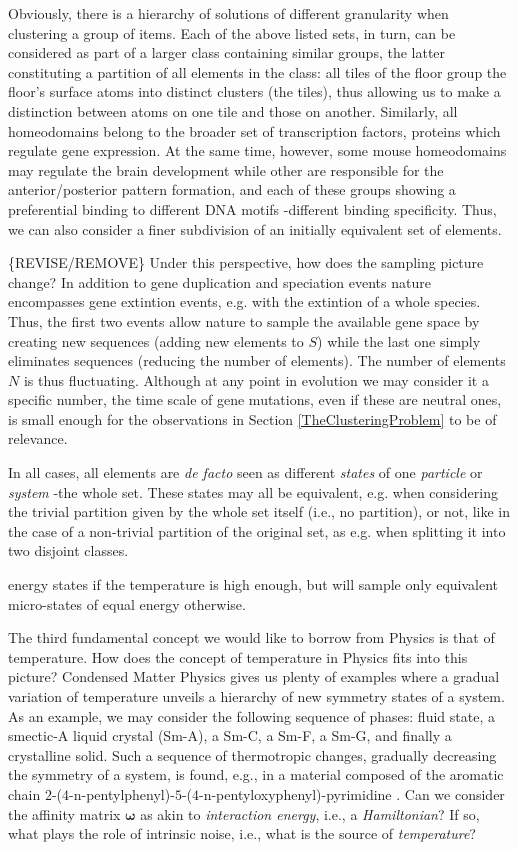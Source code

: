 \documentclass[twocolumn,aps,sort,nofootinbib]{revtex4}
\begin{document}
Obviously, there is a hierarchy of solutions of
different granularity when clustering a group of items.
Each of the above listed sets, in turn, can be considered as part of a larger class containing similar
groups, the latter constituting a partition of all elements in the class: all tiles of the floor group the floor's
surface atoms into distinct clusters (the tiles), thus allowing us to make a distinction
between atoms on one tile and those on another. Similarly, all homeodomains belong to
the broader set of  transcription factors, proteins which regulate gene expression.
At the same time, however, some mouse homeodomains may
regulate the brain development while other are responsible for the anterior/posterior pattern formation,
and each of these groups showing a preferential binding to different DNA motifs -different
binding specificity.
Thus, we can also consider a finer subdivision of an initially equivalent set of elements.

\{REVISE/REMOVE\}
Under this perspective, how does the sampling picture change?
In addition to gene duplication and speciation events nature
encompasses gene extintion events, e.g. with the extintion of
a whole species. Thus, the first two events allow nature to
sample the available gene space by creating new sequences
(adding new elements to $S$) while the last one simply eliminates
sequences (reducing the number of elements). 
The number of elements $N$ is thus fluctuating. Although
at any point in evolution we may consider it a specific number,
the time scale of gene mutations, even if these are neutral ones,
is small enough for the observations in 
Section \ref{TheClusteringProblem} to be of relevance.

In all cases, all elements are {\sl de facto} seen
as different {\sl states} of one {\sl particle} or {\sl system} -the whole set. These states may all be
equivalent, e.g. when considering the trivial partition given by the whole set itself 
(i.e., no partition), 
or not, like in the case of a non-trivial partition of the original set, 
as e.g. when splitting it into two disjoint classes. 

energy states
if the temperature is high enough, but will sample only equivalent micro-states
of equal energy otherwise.

The third fundamental concept we would like to borrow from Physics is that of temperature.
How does the concept of temperature in Physics fits into this picture?
Condensed Matter Physics gives us plenty of examples where a gradual
variation of temperature unveils a hierarchy of new symmetry states of
a system. As an example, we may consider the following sequence of phases:
fluid state, a smectic-A liquid crystal (Sm-A), a Sm-C, a Sm-F, a Sm-G,
and finally a crystalline solid. Such a sequence of thermotropic changes,
gradually decreasing the symmetry of a system,
is found, e.g., in a material composed of the aromatic chain
$2$-($4$-n-pentylphenyl)-$5$-($4$-n-pentyloxyphenyl)-pyrimidine \cite{Chaikin95}.
Can we consider the affinity matrix $\boldsymbol{\omega}$ as 
akin to {\sl interaction energy}, i.e., a {\sl Hamiltonian}? 
If so, what plays the role of intrinsic noise, i.e., what is the
source of {\sl temperature}? 
\end{document}
